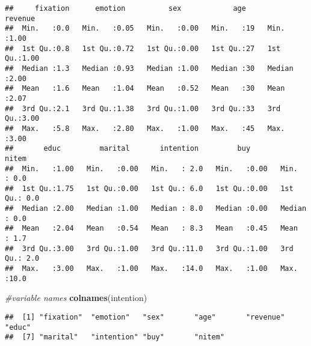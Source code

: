 \documentclass[
]{book}
\newenvironment{Shaded}{\begin{snugshade}}{\end{snugshade}}
\newcommand{\CommentTok}[1]{\textcolor[rgb]{0.56,0.35,0.01}{\textit{#1}}}
\newcommand{\KeywordTok}[1]{\textcolor[rgb]{0.13,0.29,0.53}{\textbf{#1}}}
\newcommand{\NormalTok}[1]{#1}
\begin{document}
\begin{verbatim}
##     fixation      emotion          sex            age        revenue    
##  Min.   :0.0   Min.   :0.05   Min.   :0.00   Min.   :19   Min.   :1.00  
##  1st Qu.:0.8   1st Qu.:0.72   1st Qu.:0.00   1st Qu.:27   1st Qu.:1.00  
##  Median :1.3   Median :0.93   Median :1.00   Median :30   Median :2.00  
##  Mean   :1.6   Mean   :1.04   Mean   :0.52   Mean   :30   Mean   :2.07  
##  3rd Qu.:2.1   3rd Qu.:1.38   3rd Qu.:1.00   3rd Qu.:33   3rd Qu.:3.00  
##  Max.   :5.8   Max.   :2.80   Max.   :1.00   Max.   :45   Max.   :3.00  
##       educ         marital       intention         buy           nitem     
##  Min.   :1.00   Min.   :0.00   Min.   : 2.0   Min.   :0.00   Min.   : 0.0  
##  1st Qu.:1.75   1st Qu.:0.00   1st Qu.: 6.0   1st Qu.:0.00   1st Qu.: 0.0  
##  Median :2.00   Median :1.00   Median : 8.0   Median :0.00   Median : 0.0  
##  Mean   :2.04   Mean   :0.54   Mean   : 8.3   Mean   :0.45   Mean   : 1.7  
##  3rd Qu.:3.00   3rd Qu.:1.00   3rd Qu.:11.0   3rd Qu.:1.00   3rd Qu.: 2.0  
##  Max.   :3.00   Max.   :1.00   Max.   :14.0   Max.   :1.00   Max.   :10.0
\end{verbatim}

\begin{Shaded}
\begin{Highlighting}[]
\CommentTok{#variable names}
\KeywordTok{colnames}\NormalTok{(intention)}
\end{Highlighting}
\end{Shaded}

\begin{verbatim}
##  [1] "fixation"  "emotion"   "sex"       "age"       "revenue"   "educ"     
##  [7] "marital"   "intention" "buy"       "nitem"
\end{verbatim}
\end{document}
